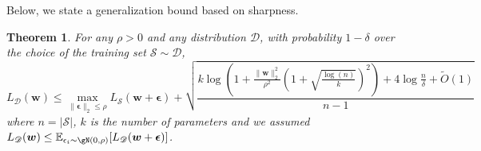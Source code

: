 \documentclass{article} %
\newtheorem{theorem}{Theorem}
\begin{document}
Below, we state a generalization bound based on sharpness.

\begin{theorem}
For any $\rho>0$ and any distribution $\mathscr{D}$, with probability $1-\delta$ over the choice of the training set $\mathcal{S}\sim \mathscr{D}$, 
\begin{equation}
    L_\mathscr{D}(\boldsymbol{w}) \leq \max_{\|\boldsymbol{\epsilon}\|_2 \leq \rho} L_\mathcal{S}(\boldsymbol{w} + \boldsymbol{\epsilon}) +\sqrt{\frac{k\log\left(1+\frac{\|\boldsymbol{w}\|_2^2}{\rho^2}\left(1+\sqrt{\frac{\log(n)}{k}}\right)^2\right) + 4\log\frac{n}{\delta} + \tilde{O}(1)}{n-1}}
\end{equation}
where $n=|\mathcal{S}|$, $k$ is the number of parameters and we assumed $L_\mathscr{D}(\boldsymbol{w}) \leq \mathbb{E}_{\epsilon_i \sim \gN(0,\rho)}[L_\mathscr{D}(\boldsymbol{w}+\boldsymbol{\epsilon})]$.
\end{theorem}
\end{document}
